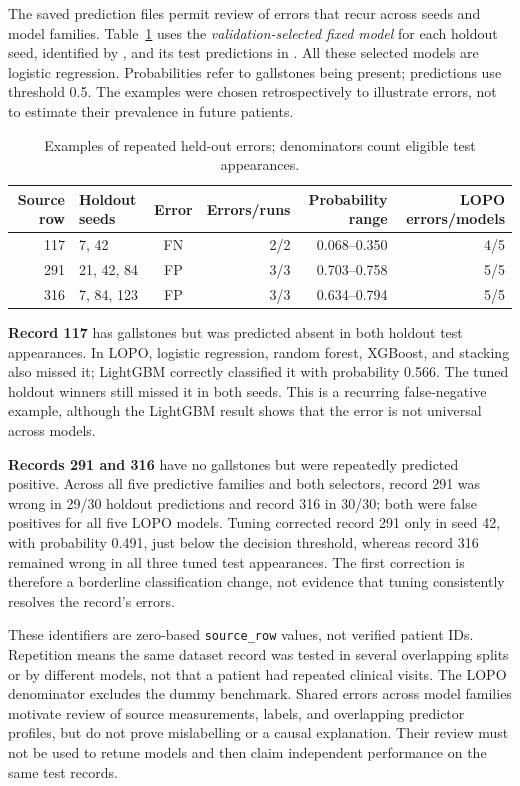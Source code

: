 The saved prediction files permit review of errors that recur across seeds
and model families. Table~\ref{tab:building-repeated-errors} uses the
\emph{validation-selected fixed model} for each holdout seed, identified by
\protect{}, and its test predictions in
\protect{}. All these selected models are logistic
regression. Probabilities refer to gallstones being present; predictions use
threshold 0.5. The examples were chosen retrospectively to illustrate errors,
not to estimate their prevalence in future patients.

\begin{table}[H]
\centering
\small
\caption{Examples of repeated held-out errors; denominators count eligible test appearances.}
\label{tab:building-repeated-errors}
\begin{tabular}{@{}rlcrrr@{}}
\toprule
Source row & Holdout seeds & Error & Errors/runs & Probability range & LOPO errors/models \\
\midrule
117 & 7, 42      & FN & 2/2 & 0.068--0.350 & 4/5 \\
291 & 21, 42, 84 & FP & 3/3 & 0.703--0.758 & 5/5 \\
316 & 7, 84, 123 & FP & 3/3 & 0.634--0.794 & 5/5 \\
\bottomrule
\end{tabular}
\end{table}

\textbf{Record 117} has gallstones but was predicted absent in both holdout
test appearances. In LOPO, logistic regression, random forest, XGBoost, and
stacking also missed it; LightGBM correctly classified it with probability
0.566. The tuned holdout winners still missed it in both seeds. This is a
recurring false-negative example, although the LightGBM result shows that
the error is not universal across models.

\textbf{Records 291 and 316} have no gallstones but were repeatedly predicted
positive. Across all five predictive families and both selectors, record 291
was wrong in 29/30 holdout predictions and record 316 in 30/30; both were
false positives for all five LOPO models. Tuning corrected record 291 only
in seed 42, with probability 0.491, just below the decision threshold,
whereas record 316 remained wrong in all three tuned test appearances.
The first correction is therefore a borderline classification change, not
evidence that tuning consistently resolves the record's errors.

These identifiers are zero-based \texttt{source\_row} values, not verified
patient IDs. Repetition means the same dataset record was tested in several
overlapping splits or by different models, not that a patient had repeated
clinical visits. The LOPO denominator excludes the dummy benchmark. Shared
errors across model families motivate review of source measurements, labels,
and overlapping predictor profiles, but do not prove mislabelling or a causal
explanation. Their review must not be used to retune models and then claim
independent performance on the same test records.

